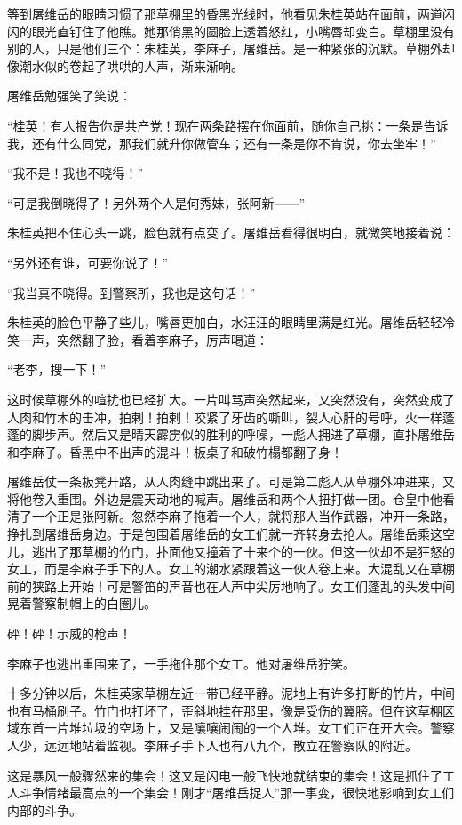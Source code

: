 \par 等到屠维岳的眼睛习惯了那草棚里的昏黑光线时，他看见朱桂英站在面前，两道闪闪的眼光直钉住了他瞧。她那俏黑的圆脸上透着怒红，小嘴唇却变白。草棚里没有别的人，只是他们三个：朱桂英，李麻子，屠维岳。是一种紧张的沉默。草棚外却像潮水似的卷起了哄哄的人声，渐来渐响。
\par 屠维岳勉强笑了笑说：
\par “桂英！有人报告你是共产党！现在两条路摆在你面前，随你自己挑：一条是告诉我，还有什么同党，那我们就升你做管车；还有一条是你不肯说，你去坐牢！”
\par “我不是！我也不晓得！”
\par “可是我倒晓得了！另外两个人是何秀妹，张阿新——”
\par 朱桂英把不住心头一跳，脸色就有点变了。屠维岳看得很明白，就微笑地接着说：
\par “另外还有谁，可要你说了！”
\par “我当真不晓得。到警察所，我也是这句话！”
\par 朱桂英的脸色平静了些儿，嘴唇更加白，水汪汪的眼睛里满是红光。屠维岳轻轻冷笑一声，突然翻了脸，看着李麻子，厉声喝道：
\par “老李，搜一下！”
\par 这时候草棚外的喧扰也已经扩大。一片叫骂声突然起来，又突然没有，突然变成了人肉和竹木的击冲，拍剌！拍剌！咬紧了牙齿的嘶叫，裂人心肝的号呼，火一样蓬蓬的脚步声。然后又是晴天霹雳似的胜利的呼噪，一彪人拥进了草棚，直扑屠维岳和李麻子。昏黑中不出声的混斗！板桌子和破竹榻都翻了身！
\par 屠维岳仗一条板凳开路，从人肉缝中跳出来了。可是第二彪人从草棚外冲进来，又将他卷入重围。外边是震天动地的喊声。屠维岳和两个人扭打做一团。仓皇中他看清了一个正是张阿新。忽然李麻子拖着一个人，就将那人当作武器，冲开一条路，挣扎到屠维岳身边。于是包围着屠维岳的女工们就一齐转身去抢人。屠维岳乘这空儿，逃出了那草棚的竹门，扑面他又撞着了十来个的一伙。但这一伙却不是狂怒的女工，而是李麻子手下的人。女工的潮水紧跟着这一伙人卷上来。大混乱又在草棚前的狭路上开始！可是警笛的声音也在人声中尖厉地响了。女工们蓬乱的头发中间晃着警察制帽上的白圈儿。
\par 砰！砰！示威的枪声！
\par 李麻子也逃出重围来了，一手拖住那个女工。他对屠维岳狞笑。
\par 十多分钟以后，朱桂英家草棚左近一带已经平静。泥地上有许多打断的竹片，中间也有马桶刷子。竹门也打坏了，歪斜地挂在那里，像是受伤的翼膀。但在这草棚区域东首一片堆垃圾的空场上，又是嚷嚷闹闹的一个人堆。女工们正在开大会。警察人少，远远地站着监视。李麻子手下人也有八九个，散立在警察队的附近。
\par 这是暴风一般骤然来的集会！这又是闪电一般飞快地就结束的集会！这是抓住了工人斗争情绪最高点的一个集会！刚才“屠维岳捉人”那一事变，很快地影响到女工们内部的斗争。
